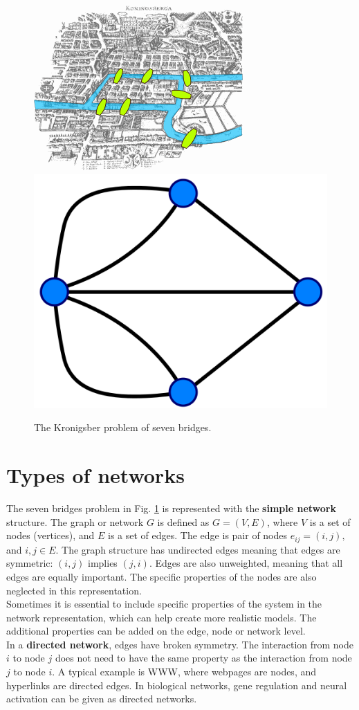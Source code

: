 \begin{figure}[h!]
	\centering
	\includegraphics[width=0.4\linewidth]{Figures/Konigsberg_bridges.png} \hspace{2cm}
	\includegraphics[width=0.4\linewidth]{Figures/Konigsberg_graph.png}
	\caption{The Kronigsber problem of seven bridges.}
	\label{fig:Krgraph}
\end{figure}

\section{Types of networks}

The seven bridges problem in Fig. \ref{fig:Krgraph} is represented with the \textbf{simple network} structure. The graph or network $G$ is defined as $G=(V, E)$, where $V$ is a set of nodes (vertices), and $E$ is a set of edges. The edge is pair of nodes $e_{ij} = (i, j), $ and $i,j\in E$. The graph structure has undirected edges meaning that edges are symmetric: $(i, j)$ implies $(j, i)$. Edges are also unweighted, meaning that all edges are equally important. The specific properties of the nodes are also neglected in this representation.\\

Sometimes it is essential to include specific properties of the system in the network representation, which can help create more realistic models. The additional properties can be added on the edge, node or network level. \\

In a \textbf{directed network}, edges have broken symmetry. The interaction from node $i$ to node $j$ does not need to have the same property as the interaction from node $j$ to node $i$. A typical example is WWW, where webpages are nodes, and hyperlinks are directed edges. In biological networks, gene regulation and neural activation can be given as directed networks. \\ %

